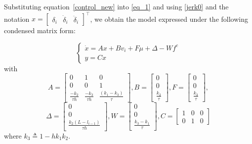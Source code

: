 {Substituting equation~\eqref{control_new} into \eqref{eq_1} and using \eqref{jerk0} and the notation $x = \begin{bmatrix} \delta_i & \dot{\delta}_i & \ddot{\delta}_i \end{bmatrix}^{\top}$, we obtain the model expressed under the following condensed matrix form:

%
\begin{equation}\label{CACC}
      \left\{ \begin{array}{l}
        \dot{x}=A x+B v_i+F \mu+\Delta - W f^c \\
         y = Cx\end{array}\right.
\end{equation}  
with 
\begin{equation*}
        A  =\begin{bmatrix}
        0 & 1 & 0 \\
        0 & 0 & 1 \\
        \frac{-k_2}{\tau h} &  \frac{-k_3}{\tau h }& \frac{\left(k_1-k_3\right)}{\tau}
          \end{bmatrix},
        B =\begin{bmatrix}
        0 \\
        0 \\
        \frac{k_2}{\tau}
          \end{bmatrix}, 
          F=\begin{bmatrix}
        0 \\
        0 \\
       \frac{k_3}{\tau}
         \end{bmatrix},    \end{equation*}
         \begin{equation*}
         \Delta=\begin{bmatrix}
        0 \\
        0 \\
        \frac{k_2\left(L-l_{i-1}\right)}{\tau h}
         \end{bmatrix},
        W  =\begin{bmatrix}
        0 \\
        0 \\
        \frac{k_3-k_1}{\tau}
        \end{bmatrix},  C=\begin{bmatrix}
        1 & 0 & 0 \\
        0 & 1 & 0
          \end{bmatrix}
\end{equation*}
where $k_3 \triangleq 1-h k_{1}k_{2}$.

}
